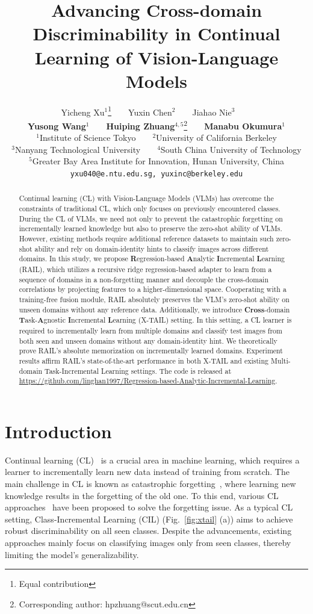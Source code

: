 \documentclass{article}
\title{Advancing Cross-domain Discriminability in Continual Learning of Vision-Language Models}
\author{
  Yicheng Xu$^{1}$\thanks{Equal contribution}\ \ \ \ Yuxin Chen$^{2}$\footnotemark[1]\ \ \ \ Jiahao Nie$^{3}$\ \ \ \ \\ 
  \textbf{Yusong Wang}$^{1}$\ \ \ \ \textbf{Huiping Zhuang}$^{4, 5}$\thanks{Corresponding author: hpzhuang@scut.edu.cn}\ \ \ \ \textbf{Manabu Okumura}$^{1}$ \smallskip\\
  $^{1}$Institute of Science Tokyo\ \ \ \ $^{2}$University of California Berkeley\\ $^{3}$Nanyang Technological University\ \ \ \ $^{4}$South China University of Technology\\
  $^{5}$Greater Bay Area Institute for Innovation, Hunan University, China \smallskip\\
  \texttt{yxu040@e.ntu.edu.sg, yuxinc@berkeley.edu}
}
\begin{document}
\maketitle


\begin{abstract}
Continual learning (CL) with Vision-Language Models (VLMs) has overcome the constraints of traditional CL, which only focuses on previously encountered classes. During the CL of VLMs, we need not only to prevent the catastrophic forgetting on incrementally learned knowledge but also to preserve the zero-shot ability of VLMs. However, existing methods require additional reference datasets to maintain such zero-shot ability and rely on domain-identity hints to classify images across different domains. In this study, we propose \textbf{R}egression-based \textbf{A}nalytic \textbf{I}ncremental \textbf{L}earning (RAIL), which utilizes a recursive ridge regression-based adapter to learn from a sequence of domains in a non-forgetting manner and decouple the cross-domain correlations by projecting features to a higher-dimensional space. Cooperating with a training-free fusion module, RAIL absolutely preserves the VLM's zero-shot ability on unseen domains without any reference data.
Additionally, we introduce \textbf{Cross}-domain \textbf{T}ask-\textbf{A}gnostic \textbf{I}ncremental \textbf{L}earning (X-TAIL) setting. In this setting, a CL learner is required to incrementally learn from multiple domains and classify test images from both seen and unseen domains without any domain-identity hint.
We theoretically prove RAIL's absolute memorization on incrementally learned domains. Experiment results affirm RAIL's state-of-the-art performance in both X-TAIL and existing Multi-domain Task-Incremental Learning settings. The code is released at \url{https://github.com/linghan1997/Regression-based-Analytic-Incremental-Learning}.
\end{abstract}

\section{Introduction}
\label{sec:intro}
Continual learning (CL)~\cite{hadsell2020embracing, de2021continual, wang2024comprehensive} is a crucial area in machine learning, which requires a learner to incrementally learn new data instead of training from scratch. The main challenge in CL is known as catastrophic forgetting~\cite{mccloskey1989catastrophic}, where learning new knowledge results in the forgetting of the old one. To this end, various CL approaches~\cite{kirkpatrick2017overcoming, li2017learning, rebuffi2017icarl, buzzega2020dark, wang2024comprehensive, liu2024locality} have been proposed to solve the forgetting issue. As a typical CL setting, Class-Incremental Learning (CIL) (Fig.~\ref{fig:xtail} (a)) aims to achieve robust discriminability on all seen classes. Despite the advancements, existing approaches mainly focus on classifying images only from seen classes, thereby limiting the model's generalizability.
\end{document}

